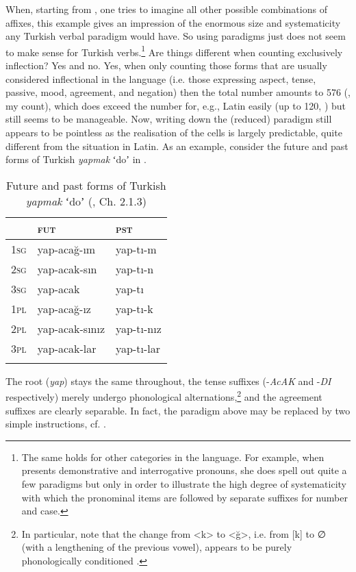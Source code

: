 \documentclass[output=paper]{langsci/langscibook}
\begin{document}
When, starting from , one tries to imagine all other possible combinations of affixes, this example gives an impression of the enormous size and systematicity any Turkish verbal paradigm would have. So using paradigms just does not seem to make sense for Turkish verbs.\footnote{The same holds for other categories in the language. For example, when \citet[311--320]{Kornfilt1997} presents demonstrative and interrogative pronouns, she does spell out quite a few paradigms but only in order to illustrate the high degree of systematicity with which the pronominal items are followed by separate suffixes for number and case.} Are things different when counting exclusively inflection? Yes and no. Yes, when only counting those forms that are usually considered inflectional in the language (i.e. those expressing aspect, tense, passive, mood, agreement, and negation) then the total number amounts to 576 (\citealt{Kornfilt1997}, my count), which does exceed the number for, e.g., Latin easily (up to 120, \citealt[396, my count]{Matthews1972}) but still seems to be manageable. Now, writing down the (reduced) paradigm still appears to be pointless as the realisation of the cells is largely predictable, quite different from the situation in Latin. As an example, consider the future and past forms of Turkish \textit{yapmak} ʻdoʼ in .\largerpage[-2]

\begin{table}
    \caption{Future and past forms of Turkish \textit{yapmak} ʻdoʼ (\citealt{Kornfilt1997}, Ch. 2.1.3)\label{tab:reiner:2}}
\begin{tabular}{lll} 
\lsptoprule
               &   {\textsc{fut}}    & {\textsc{pst}}\\\midrule
{\textsc{1sg}} &  yap-acağ-ım &    yap-tı-m\\
{\textsc{2sg}} &  yap-acak-sın &   yap-tı-n\\
{\textsc{3sg}} &  yap-acak &          yap-tı\\
{\textsc{1pl}} &  yap-acağ-ız &    yap-tı-k\\
{\textsc{2pl}} &  yap-acak-sınız &    yap-tı-nız\\
{\textsc{3pl}} &  yap-acak-lar &      yap-tı-lar\\ 
\lspbottomrule
\end{tabular}
\end{table}


The root (\textit{yap}) stays the same throughout, the tense suffixes (-\textit{AcAK} and -\textit{DI} respectively) merely undergo phonological alternations,\footnote{In particular, note that the change from <k> to <ğ>, i.e. from [k] to \textrm{∅} (with a lengthening of the previous vowel), appears to be purely phonologically conditioned \citep[13–14, 91]{Ketrez2012}.} and the agreement suffixes are clearly separable. In fact, the paradigm above may be replaced by two simple instructions, cf. .
\end{document}
